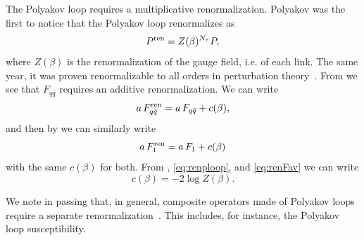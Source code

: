 The Polyakov loop requires a multiplicative renormalization. Polyakov was the
first to notice that the Polyakov loop renormalizes as~\cite{polyakov_gauge_1980}
\begin{equation}\label{eq:renploop}
  P^{\rm ren}=Z(\beta)^{N_\tau}P,
\end{equation}
where $Z(\beta)$ is the renormalization of the gauge field, i.e. of
each link. The same year, it was proven renormalizable to all orders in
perturbation theory~\cite{arefeva_quantum_1980,gervais_slope_1980}. 
From  we see that $F_{q\bar{q}}$ requires an
additive renormalization. We can write
\begin{equation}\label{eq:renFav}
  a\,F_{q\bar{q}}^{\rm ren}=a\,F_{q\bar{q}}+c(\beta),
\end{equation}
and then by  we can similarly write
\begin{equation}
  a\,F_1^{\rm ren}=a\,F_1+c(\beta)
\end{equation}
with the same $c(\beta)$ for both. From ,
\eqref{eq:renploop}, and \eqref{eq:renFav} we can write
\begin{equation}
  c(\beta)=-2\log Z(\beta).
\end{equation}

We note in passing that, in general, composite operators made of Polyakov loops
require a separate 
renormalization~\cite{polyakov_gauge_1980,arefeva_quantum_1980,gervais_slope_1980,korchemsky_renormalization_1987}.
This includes, for instance, the Polyakov loop susceptibility.

